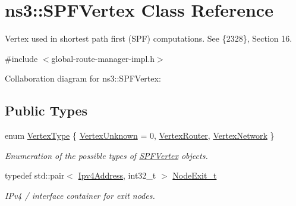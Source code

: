 \hypertarget{classns3_1_1SPFVertex}{}\section{ns3\+:\+:S\+P\+F\+Vertex Class Reference}
\label{classns3_1_1SPFVertex}


Vertex used in shortest path first (S\+PF) computations. See \{2328\}, Section 16.  




{\ttfamily \#include $<$global-\/route-\/manager-\/impl.\+h$>$}



Collaboration diagram for ns3\+:\+:S\+P\+F\+Vertex\+:
\subsection*{Public Types}
\begin{DoxyCompactItemize}
\item 
enum \hyperlink{classns3_1_1SPFVertex_a20f8a4cfc99a1b7ecd10a23151b93afd}{Vertex\+Type} \{ \hyperlink{classns3_1_1SPFVertex_a20f8a4cfc99a1b7ecd10a23151b93afdaf0e999939533bcbb83b6cb9bf4b37a20}{Vertex\+Unknown} = 0, 
\hyperlink{classns3_1_1SPFVertex_a20f8a4cfc99a1b7ecd10a23151b93afda340822983a2833fff14de88ea20a3f31}{Vertex\+Router}, 
\hyperlink{classns3_1_1SPFVertex_a20f8a4cfc99a1b7ecd10a23151b93afda00415acb788d8d95bee545fe2046c2a8}{Vertex\+Network}
 \}\begin{DoxyCompactList}\small\item\em Enumeration of the possible types of \hyperlink{classns3_1_1SPFVertex}{S\+P\+F\+Vertex} objects. \end{DoxyCompactList}
\item 
typedef std\+::pair$<$ \hyperlink{classns3_1_1Ipv4Address}{Ipv4\+Address}, int32\+\_\+t $>$ \hyperlink{classns3_1_1SPFVertex_a0adf6255ec0357050ef5436597b4cb32}{Node\+Exit\+\_\+t}
\begin{DoxyCompactList}\small\item\em I\+Pv4 / interface container for exit nodes. \end{DoxyCompactList}\end{DoxyCompactItemize}
